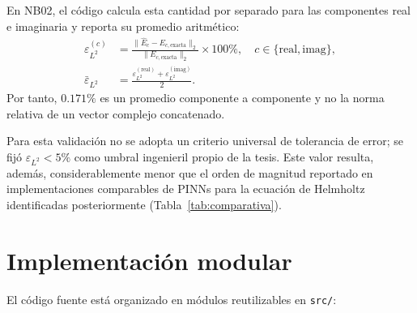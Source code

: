 En NB02, el código calcula esta cantidad por separado para las componentes real
e imaginaria y reporta su promedio aritmético:
%
\begin{equation}
\begin{aligned}
    \varepsilon_{L^2}^{(c)} & =
    \frac{\|\hat{E}_c - E_{c,\text{exacta}}\|_2}
    {\|E_{c,\text{exacta}}\|_2} \times 100\%,
    \quad c \in \{\mathrm{real},\mathrm{imag}\},\\
    \bar{\varepsilon}_{L^2} & =
    \frac{\varepsilon_{L^2}^{(\mathrm{real})}+
    \varepsilon_{L^2}^{(\mathrm{imag})}}{2}.
\end{aligned}
\label{eq:l2_componentes}
\end{equation}
%
Por tanto, $0.171\%$ es un promedio componente a componente y no la norma
relativa de un vector complejo concatenado.

Para esta validación no se adopta un criterio universal de tolerancia de error;
se fijó
$\varepsilon_{L^2} < 5\%$ como umbral ingenieril propio de la tesis. Este
valor resulta, además, considerablemente menor que el orden de magnitud
reportado en implementaciones comparables de PINNs para la ecuación de
Helmholtz identificadas posteriormente (Tabla~\ref{tab:comparativa}).

\section{Implementación modular}

El código fuente está organizado en módulos reutilizables en \texttt{src/}:

